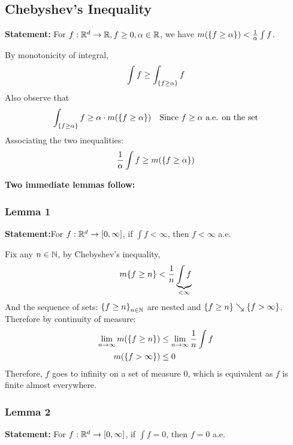 \subsection{Chebyshev's Inequality}
\textbf{Statement:} For $f: {\mathbb{R}}^d \to {\mathbb{R}}, f\geq 0, \alpha \in {\mathbb{R}}$, we have $m(\qty{f\geq \alpha}) <\frac{1}{\alpha}\int f$. \\

\begin{prf}
By monotonicity of integral, 
$$\int f\geq \int_{\qty{f\geq \alpha}} f$$
Also observe that 
$$\int_{\qty{f\geq \alpha}} f \geq \alpha\cdot m(\qty{f\geq \alpha})\quad \text{Since }f\geq \alpha \text{ a.e. on the set}$$
Associating the two inequalities: 
$$\frac{1}{\alpha} \int f\geq m(\qty{f\geq \alpha})$$

\end{prf}

\textbf{Two immediate lemmas follow: }
\subsubsection{Lemma 1}
\textbf{Statement:}For $f:{\mathbb{R}}^d\to [0, \infty]$, if $\int f<\infty$, then $f<\infty$ a.e.\\

\begin{prf}
	Fix any $n\in \mathbb{N}$, by Chebyshev's inequality, 
	$$m\qty{f\geq n} < \frac{1}{n} \underbrace{\int f}_{<\infty}$$
	And the sequence of sets: $\qty{f\geq n}_{n\in \mathbb{N}}$ are nested and $ \qty{f\geq n}\searrow \qty{f>\infty}$. Therefore by continuity of measure: 
	\begin{align*}
		\lim_{n\to\infty} m(\qty{f\geq n}) &\leq \lim_{n\to\infty} \frac{1}{n}\int f\\
		m(\qty{f>\infty}) &\leq 0\\
	\end{align*}
	Therefore, $f$ goes to infinity on a set of measure 0, which is equivalent as $f$ is finite almost everywhere. 
	
	
\end{prf}

\subsubsection{Lemma 2}
\textbf{Statement:} For $f: {\mathbb{R}}^d \to [0, \infty]$, if $\int f = 0$, then $f=0$ a.e.\\

